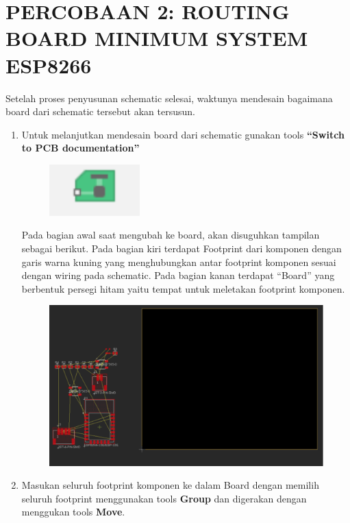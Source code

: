 \section*{PERCOBAAN 2: ROUTING BOARD MINIMUM SYSTEM ESP8266}
Setelah proses penyusunan schematic selesai, waktunya mendesain bagaimana board
dari schematic tersebut akan tersusun.
\begin{enumerate}
    \item Untuk melanjutkan mendesain board dari schematic gunakan tools \textbf{“Switch to PCB
    documentation”}
    \begin{figure}[H]
        \centering
        \includegraphics[width=0.4\linewidth]{P1/img/switchtopcb.png}
    \end{figure}
    Pada bagian awal saat mengubah ke board, akan disuguhkan tampilan sebagai berikut. Pada
bagian kiri terdapat Footprint dari komponen dengan garis warna kuning yang
menghubungkan antar footprint komponen sesuai dengan wiring pada schematic. Pada
bagian kanan terdapat “Board” yang berbentuk persegi hitam yaitu tempat untuk meletakan
footprint komponen.
    \begin{figure}[H]
        \centering
        \includegraphics[width=0.9\linewidth]{P1/img/PCBawal.png}
    \end{figure}
    \item Masukan seluruh footprint komponen ke dalam Board dengan memilih seluruh footprint menggunakan tools \textbf{Group} dan digerakan dengan menggukan tools \textbf{Move}.
    \begin{figure}[H]

\end{figure}
\end{enumerate}
